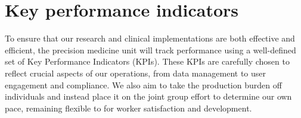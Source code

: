 %
%
%
%

\section{Key performance indicators}

To ensure that our research and clinical implementations are both effective and efficient, the precision medicine unit will track performance using a well-defined set of Key Performance Indicators (KPIs). 
These KPIs are carefully chosen to reflect crucial aspects of our operations, from data management to user engagement and compliance.
We also aim to take the production burden off individuals and instead place it on the joint group effort to determine our own pace, remaining flexible to for worker satisfaction and development.

